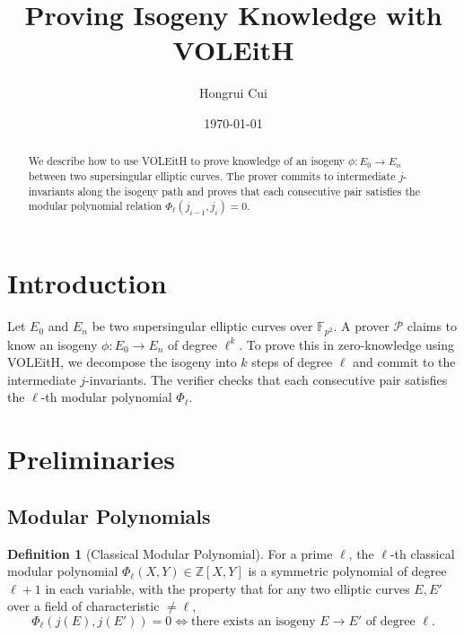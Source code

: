 \documentclass[11pt,a4paper]{article}
\title{Proving Isogeny Knowledge with VOLEitH}
\author{Hongrui Cui}
\date{\today}
\theoremstyle{definition}
\newtheorem{definition}[theorem]{Definition}
\theoremstyle{remark}
\newcommand{\F}{\mathbb{F}}
\newcommand{\Z}{\mathbb{Z}}
\newcommand{\calP}{\mathcal{P}}
\newcommand{\polyrel}{\Phi}
\begin{document}
\maketitle

\begin{abstract}
	We describe how to use VOLEitH to prove knowledge of an isogeny
	$\phi: E_0 \to E_n$ between two supersingular elliptic curves.
	The prover commits to intermediate $j$-invariants along the isogeny
	path and proves that each consecutive pair satisfies the modular
	polynomial relation $\polyrel_{\ell}(j_{i-1}, j_i) = 0$.
\end{abstract}

\tableofcontents

\section{Introduction}

Let $E_0$ and $E_n$ be two supersingular elliptic curves over $\F_{p^2}$.
A prover $\calP$ claims to know an isogeny $\phi: E_0 \to E_n$ of degree
$\ell^k$. To prove this in zero-knowledge using VOLEitH, we decompose
the isogeny into $k$ steps of degree $\ell$ and commit to the intermediate
$j$-invariants. The verifier checks that each consecutive pair satisfies the
$\ell$-th modular polynomial $\polyrel_{\ell}$.

\section{Preliminaries}

\subsection{Modular Polynomials}

\begin{definition}[Classical Modular Polynomial]
	For a prime $\ell$, the $\ell$-th classical modular polynomial
	$\polyrel_{\ell}(X, Y) \in \Z[X, Y]$ is a symmetric polynomial
	of degree $\ell + 1$ in each variable, with the property that for any two
	elliptic curves $E, E'$ over a field of characteristic $\neq \ell$,
	\[
		\polyrel_{\ell}(j(E), j(E')) = 0
		\iff \text{there exists an isogeny } E \to E' \text{ of degree } \ell.
	\]
\end{definition}
\end{document}
